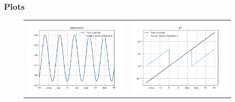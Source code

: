 \documentclass[11pt, a4paper, twoside]{article}
\begin{document}
            \subsubsection{Plots}
                \begin{figure}[H]
                    \centering
                    \setlength\tabcolsep{2pt}
                    \begin{tabular}{cc}
                        \includegraphics[scale=0.5]{Plots/Figure 1.png} &
                        \includegraphics[scale=0.5]{Plots/Figure 2.png}\\
                    \end{tabular}
                \end{figure}
\end{document}
